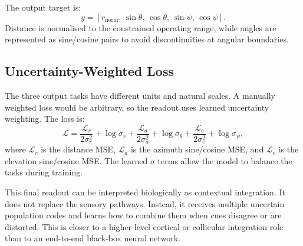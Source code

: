 The output target is:
\begin{equation}
    y =
    \left[
    r_{\text{norm}},\,
    \sin \theta,\,
    \cos \theta,\,
    \sin \psi,\,
    \cos \psi
    \right].
\end{equation}
Distance is normalised to the constrained operating range, while angles are represented as sine/cosine pairs to avoid discontinuities at angular boundaries.

\subsection{Uncertainty-Weighted Loss}

The three output tasks have different units and natural scales. A manually weighted loss would be arbitrary, so the readout uses learned uncertainty weighting. The loss is:
\begin{equation}
    \mathcal{L} =
    \frac{\mathcal{L}_r}{2\sigma_r^2} + \log\sigma_r
    + \frac{\mathcal{L}_a}{2\sigma_a^2} + \log\sigma_{\theta}
    + \frac{\mathcal{L}_e}{2\sigma_e^2} + \log\sigma_{\psi},
\end{equation}
where $\mathcal{L}_r$ is the distance MSE, $\mathcal{L}_a$ is the azimuth sine/cosine MSE, and $\mathcal{L}_e$ is the elevation sine/cosine MSE. The learned $\sigma$ terms allow the model to balance the tasks during training.

This final readout can be interpreted biologically as contextual integration. It does not replace the sensory pathways. Instead, it receives multiple uncertain population codes and learns how to combine them when cues disagree or are distorted. This is closer to a higher-level cortical or collicular integration role than to an end-to-end black-box neural network.


